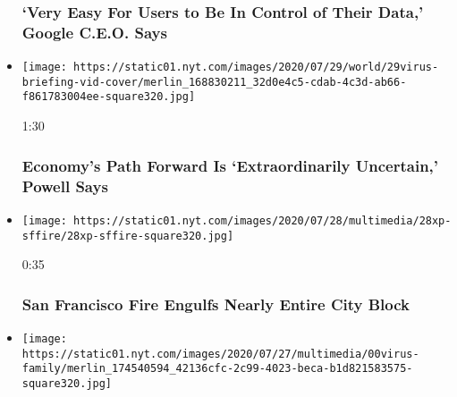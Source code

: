 \begin{itemize}
  \hypertarget{very-easy-for-users-to-be-in-control-of-their-data-google-ceo-says}{%
  \subsubsection{`Very Easy For Users to Be In Control of Their Data,'
  Google C.E.O.
  Says}\label{very-easy-for-users-to-be-in-control-of-their-data-google-ceo-says}}
\item
  \href{https://www.nytimes.com/video/us/100000007262574/fed-powell-economy-coronavirus.html?action=click\&module=video-series-bar\&region=header\&pgtype=Article\&playlistId=video/u-s}{}

  \texttt{[image: https://static01.nyt.com/images/2020/07/29/world/29virus-briefing-vid-cover/merlin\_168830211\_32d0e4c5-cdab-4c3d-ab66-f861783004ee-square320.jpg]}

  1:30

  \hypertarget{economys-path-forward-is-extraordinarily-uncertain-powell-says}{%
  \subsubsection{Economy's Path Forward Is `Extraordinarily Uncertain,'
  Powell
  Says}\label{economys-path-forward-is-extraordinarily-uncertain-powell-says}}
\item
  \href{https://www.nytimes.com/video/us/100000007260854/san-francisco-fire.html?action=click\&module=video-series-bar\&region=header\&pgtype=Article\&playlistId=video/u-s}{}

  \texttt{[image: https://static01.nyt.com/images/2020/07/28/multimedia/28xp-sffire/28xp-sffire-square320.jpg]}

  0:35

  \hypertarget{san-francisco-fire-engulfs-nearly-entire-city-block}{%
  \subsubsection{San Francisco Fire Engulfs Nearly Entire City
  Block}\label{san-francisco-fire-engulfs-nearly-entire-city-block}}
\item
  \href{https://www.nytimes.com/video/us/100000007253343/coronavirus-houston-family.html?action=click\&module=video-series-bar\&region=header\&pgtype=Article\&playlistId=video/u-s}{}

  \texttt{[image: https://static01.nyt.com/images/2020/07/27/multimedia/00virus-family/merlin\_174540594\_42136cfc-2c99-4023-beca-b1d821583575-square320.jpg]}


\end{itemize}
